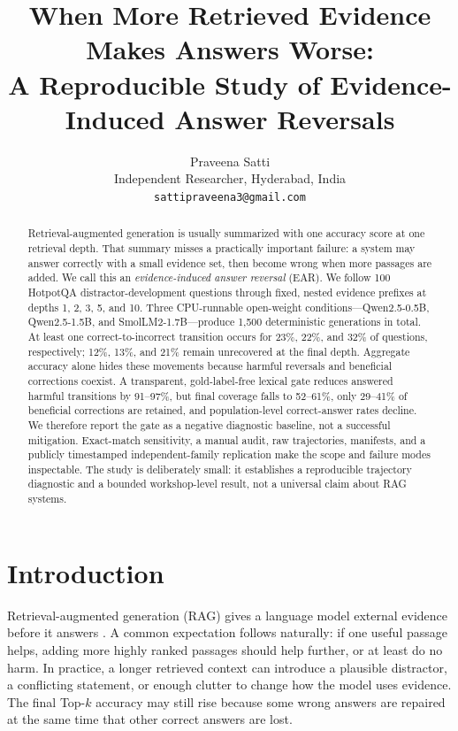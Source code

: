 \documentclass[10pt,twocolumn]{article}
\title{\textbf{When More Retrieved Evidence Makes Answers Worse:}\\
A Reproducible Study of Evidence-Induced Answer Reversals}
\author{Praveena Satti\\
\small Independent Researcher, Hyderabad, India\\
\small \texttt{sattipraveena3@gmail.com}}
\date{}
\newcommand{\qsmall}{Qwen2.5-0.5B}
\newcommand{\qlarge}{Qwen2.5-1.5B}
\newcommand{\smol}{SmolLM2-1.7B}
\begin{document}
\maketitle

\begin{abstract}
Retrieval-augmented generation is usually summarized with one accuracy score at one retrieval depth. That summary misses a practically important failure: a system may answer correctly with a small evidence set, then become wrong when more passages are added. We call this an \emph{evidence-induced answer reversal} (EAR). We follow 100 HotpotQA distractor-development questions through fixed, nested evidence prefixes at depths 1, 2, 3, 5, and 10. Three CPU-runnable open-weight conditions---\qsmall, \qlarge, and \smol---produce 1,500 deterministic generations in total. At least one correct-to-incorrect transition occurs for 23\%, 22\%, and 32\% of questions, respectively; 12\%, 13\%, and 21\% remain unrecovered at the final depth. Aggregate accuracy alone hides these movements because harmful reversals and beneficial corrections coexist. A transparent, gold-label-free lexical gate reduces answered harmful transitions by 91--97\%, but final coverage falls to 52--61\%, only 29--41\% of beneficial corrections are retained, and population-level correct-answer rates decline. We therefore report the gate as a negative diagnostic baseline, not a successful mitigation. Exact-match sensitivity, a manual audit, raw trajectories, manifests, and a publicly timestamped independent-family replication make the scope and failure modes inspectable. The study is deliberately small: it establishes a reproducible trajectory diagnostic and a bounded workshop-level result, not a universal claim about RAG systems.
\end{abstract}

\section{Introduction}

Retrieval-augmented generation (RAG) gives a language model external evidence before it answers \citep{lewis2020rag}. A common expectation follows naturally: if one useful passage helps, adding more highly ranked passages should help further, or at least do no harm. In practice, a longer retrieved context can introduce a plausible distractor, a conflicting statement, or enough clutter to change how the model uses evidence. The final Top-$k$ accuracy may still rise because some wrong answers are repaired at the same time that other correct answers are lost.
\end{document}

